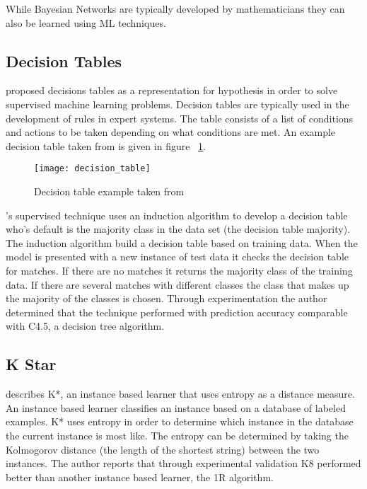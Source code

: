 While Bayesian Networks are typically developed by mathematicians they can also be learned using ML techniques. 


\subsection{Decision Tables}

\cite{kohavi1995power} proposed decisions tables as a representation for hypothesis in order to solve supervised machine learning problems. Decision tables are typically used in the development of rules in expert systems. The table consists of a list of conditions and actions to be taken depending on what conditions are met. An example decision table taken from \cite{hoffer1999modern} is given in figure ~\ref{fig:decision_table}.

\begin{figure}[!h]
\centering
\texttt{[image: decision\_table]}
\caption{Decision table example taken from \cite{hoffer1999modern}}
\label{fig:decision_table}
\end{figure}

\cite{kohavi1995power}'s supervised technique uses an induction algorithm to develop a decision table who's default is the majority class in the data set (the decision table majority). The induction algorithm build a decision table based on training data. When the model is presented with a new instance of test data it checks the decision table for matches. If there are no matches it returns the majority class of the training data. If there are several matches with different classes the class that makes up the majority of the classes is chosen. Through experimentation the author determined that the technique performed with prediction accuracy comparable with C4.5, a decision tree algorithm.

\subsection{K Star}

\cite{cleary1995k} describes K*, an instance based learner that uses entropy as a distance measure. An instance based learner classifies an instance based on a database of labeled examples. K* uses entropy in order to determine which instance in the database the current instance is most like. The entropy can be determined by taking the Kolmogorov distance (the length of the shortest string) between the two instances. The author reports that through experimental validation K8 performed better than another instance based learner, the 1R algorithm.

